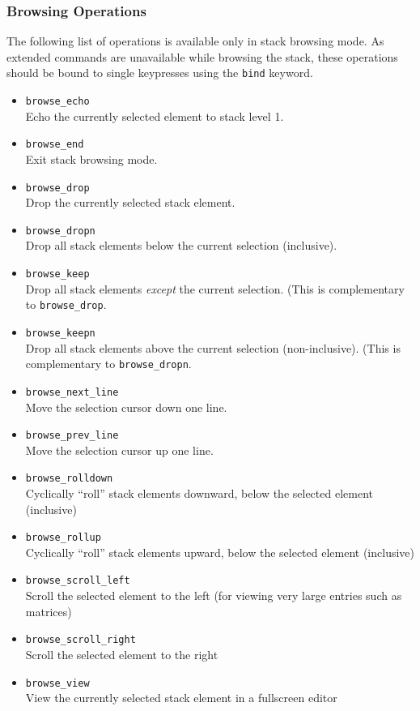 \documentclass[11pt,notitlepage]{article}
\begin{document}
\subsubsection{Browsing Operations}
\label{browse}
The following list of operations is available only in stack browsing mode.
As extended commands are unavailable while browsing the stack, these operations
should be bound to single keypresses using the {\tt bind} keyword.
\begin{itemize}
   \item {\tt browse\_echo} \\
      Echo the currently selected element to stack level 1.
   \item {\tt browse\_end} \\
      Exit stack browsing mode.
   \item {\tt browse\_drop} \\
      Drop the currently selected stack element.
   \item {\tt browse\_dropn} \\
      Drop all stack elements below the current selection (inclusive).
   \item {\tt browse\_keep} \\
      Drop all stack elements {\em except} the current selection.  (This is
      complementary to {\tt browse\_drop}.
   \item {\tt browse\_keepn} \\
      Drop all stack elements above the current selection (non-inclusive).  (This
      is complementary to {\tt browse\_dropn}.
   \item {\tt browse\_next\_line} \\
      Move the selection cursor down one line.
   \item {\tt browse\_prev\_line} \\
      Move the selection cursor up one line.
   \item {\tt browse\_rolldown} \\
      Cyclically ``roll'' stack elements downward, below the 
      selected element (inclusive)
   \item {\tt browse\_rollup} \\
      Cyclically ``roll'' stack elements upward, below the selected
      element (inclusive) 
   \item {\tt browse\_scroll\_left} \\
      Scroll the selected element to the left (for viewing very large
      entries such as matrices)
   \item {\tt browse\_scroll\_right} \\
      Scroll the selected element to the right
   \item {\tt browse\_view} \\
      View the currently selected stack element in a fullscreen editor
\end{itemize}
\end{document}
